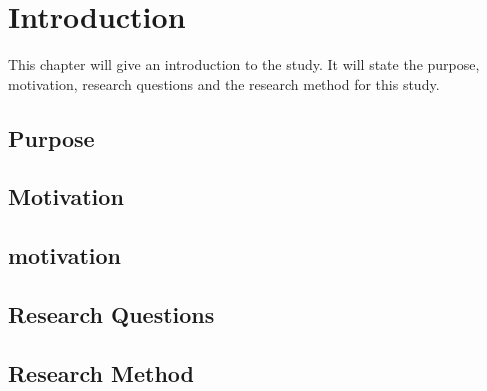 \chapter{Introduction}
\label{introduction}

This chapter will give an introduction to the study. It will state the purpose, motivation, research questions and the research method for this study. 

\section{Purpose}
\label{purpose}


\section{Motivation}
\section{motivation}


\section{Research Questions}
\label{reseachquestions}


\section{Research Method}
\label{researchmethod}
